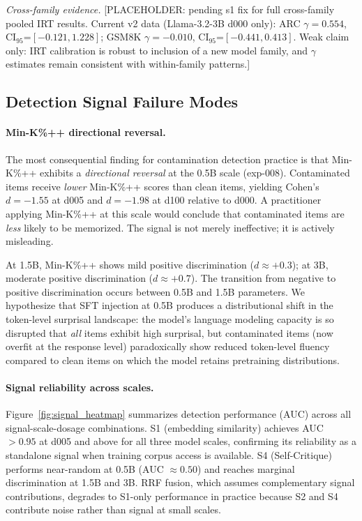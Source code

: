 \textit{Cross-family evidence.}
[PLACEHOLDER: pending s1 fix for full cross-family pooled IRT results.
Current v2 data (Llama-3.2-3B d000 only): ARC $\gamma=0.554$, CI$_{95}$=$[-0.121, 1.228]$; GSM8K $\gamma=-0.010$, CI$_{95}$=$[-0.441, 0.413]$.
Weak claim only: IRT calibration is robust to inclusion of a new model family, and $\gamma$ estimates remain consistent with within-family patterns.]

\subsection{Detection Signal Failure Modes}
\label{sec:signal_failure}

\paragraph{Min-K\%++ directional reversal.}
The most consequential finding for contamination detection practice is that Min-K\%++ \citep{zhang_2024_minkpp} exhibits a \textit{directional reversal} at the 0.5B scale (exp-008). Contaminated items receive \textit{lower} Min-K\%++ scores than clean items, yielding Cohen's $d = -1.55$ at d005 and $d = -1.98$ at d100 relative to d000. A practitioner applying Min-K\%++ at this scale would conclude that contaminated items are \textit{less} likely to be memorized. The signal is not merely ineffective; it is actively misleading.

At 1.5B, Min-K\%++ shows mild positive discrimination ($d \approx +0.3$); at 3B, moderate positive discrimination ($d \approx +0.7$). The transition from negative to positive discrimination occurs between 0.5B and 1.5B parameters. We hypothesize that SFT injection at 0.5B produces a distributional shift in the token-level surprisal landscape: the model's language modeling capacity is so disrupted that \textit{all} items exhibit high surprisal, but contaminated items (now overfit at the response level) paradoxically show reduced token-level fluency compared to clean items on which the model retains pretraining distributions.

\paragraph{Signal reliability across scales.}
Figure~\ref{fig:signal_heatmap} summarizes detection performance (AUC) across all signal-scale-dosage combinations. S1 (embedding similarity) achieves AUC $> 0.95$ at d005 and above for all three model scales, confirming its reliability as a standalone signal when training corpus access is available. S4 (Self-Critique) \citep{wust_2025_selfcritique} performs near-random at 0.5B (AUC $\approx 0.50$) and reaches marginal discrimination at 1.5B and 3B. RRF fusion, which assumes complementary signal contributions, degrades to S1-only performance in practice because S2 and S4 contribute noise rather than signal at small scales.

